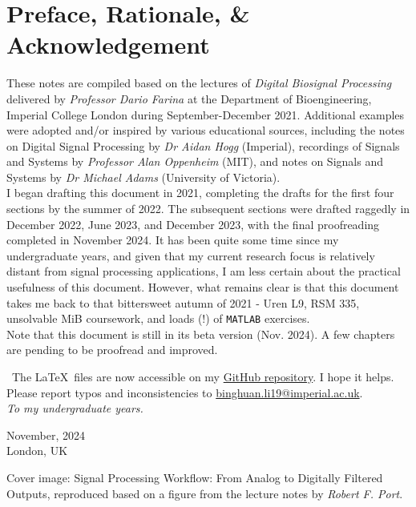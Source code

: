 \section*{Preface, Rationale, \& Acknowledgement}
These notes are compiled based on the lectures of \textit{Digital Biosignal Processing} delivered by \textit{Professor Dario Farina} at the Department of Bioengineering, Imperial College London during September-December 2021. Additional examples were adopted and/or inspired by various educational sources, including the notes on Digital Signal Processing by \textit{Dr Aidan Hogg} (Imperial), recordings of Signals and Systems by \textit{Professor Alan Oppenheim} (MIT), and notes on Signals and Systems by \textit{Dr Michael Adams} (University of Victoria). \\

I began drafting this document in 2021, completing the drafts for the first four sections by the summer of 2022. The subsequent sections were drafted raggedly in December 2022, June 2023, and December 2023, with the final proofreading completed in November 2024. It has been quite some time since my undergraduate years, and given that my current research focus is relatively distant from signal processing applications, I am less certain about the practical usefulness of this document. However, what remains clear is that this document takes me back to that bittersweet autumn of 2021 - Uren L9, RSM 335, unsolvable MiB coursework, and loads (!) of \texttt{MATLAB} exercises.\\

Note that this document is still in its beta version (Nov. 2024). A few chapters are pending to be proofread and improved.

\faGithub \ The \LaTeX \ files are now accessible on my \href{https://github.com/binghuan-li/Notes-and-Formula-Sheets}{GitHub repository}. I hope it helps. Please report typos and inconsistencies to \href{mailto:binghuan.li19@imperial.ac.uk}{binghuan.li19@imperial.ac.uk}. \\

\textit{To my undergraduate years.}

\begin{flushright}
November, 2024\\
London, UK
\end{flushright}

\vfill
{\color{gray}
Cover image: Signal Processing Workflow: From Analog to Digitally Filtered Outputs, reproduced based on a figure from the lecture notes by \textit{Robert F. Port}.
}